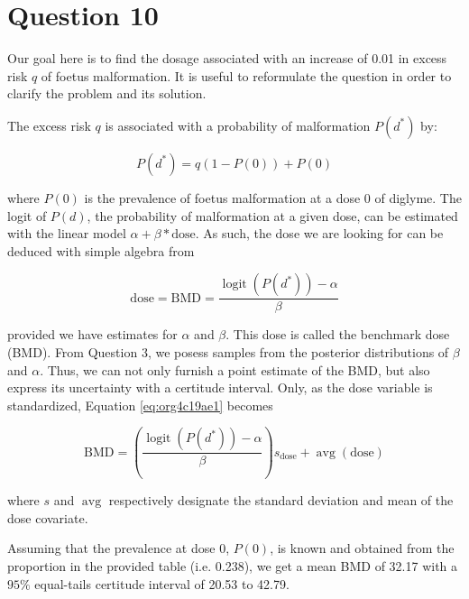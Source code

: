\documentclass[11pt]{article}
\begin{document}
\section{Question 10}
\label{sec:orgdcecd46}
Our goal here is to find the dosage associated with an increase of
0.01 in excess risk \(q\) of foetus malformation. It is useful to
reformulate the question in order to clarify the problem and its
solution.

The excess risk \(q\) is associated with a probability of malformation
\(P(d^{*})\) by:

\begin{equation}
P(d^{*})=q(1-P(0)) + P(0)
\end{equation}

where \(P(0)\) is the prevalence of foetus malformation at a dose 0 of
diglyme. The logit of \(P(d)\), the probability of malformation at a
given dose, can be estimated with the linear model \(\alpha + \beta*
\mathrm{dose}\). As such, the dose we are looking for can be deduced
with simple algebra from

\begin{equation}
\label{eq:org4c19ae1}
\mathrm{dose}=\mathrm{BMD}=\frac{\operatorname{logit}(P(d^{*})) 
- \alpha}{\beta}
\end{equation}

provided we have estimates for \(\alpha\) and \(\beta\). This dose is
called the benchmark dose (BMD). From Question 3, we posess samples
from the posterior distributions of \(\beta\) and \(\alpha\). Thus, we can
not only furnish a point estimate of the BMD, but also express its
uncertainty with a certitude interval. Only, as the dose variable is
standardized, Equation \ref{eq:org4c19ae1} becomes

\begin{equation}
\mathrm{BMD}=\left(\frac{\operatorname{logit}(P(d^{*})) - \alpha}
{\beta}\right) s_{\mathrm{dose}} + \operatorname{avg}(\mathrm{dose})
\end{equation}

where \(s\) and \(\operatorname{avg}\) respectively designate the standard
deviation and mean of the dose covariate.

Assuming that the prevalence at dose 0, \(P(0)\), is known and obtained
from the proportion in the provided table (i.e. 0.238), we get a mean
BMD of 32.17 with a \(95\%\) equal-tails certitude interval of 20.53 to
42.79.
\end{document}
